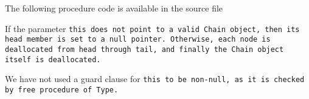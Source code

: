 The following procedure code is available in the source file

If the parameter \tt{this} does not point to a valid \tt{Chain} object,
then its \tt{head} member is set to a null pointer.
Otherwise, each node is deallocated from \tt{head} through \tt{tail},
and finally the \tt{Chain} object itself is deallocated.

\note We have not used a guard clause for \tt{this} to be non-null,
as it is checked by \tt{free} procedure of \tt{Type}.
